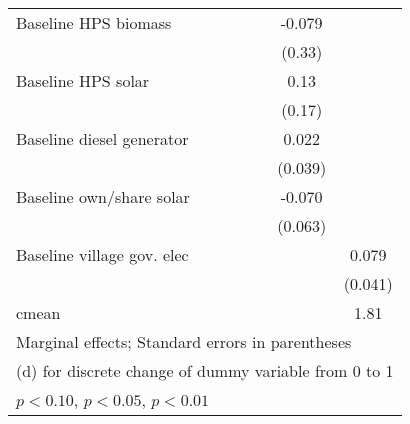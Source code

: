 \begin{table}[htbp]
\begin{tabular*}{1\hsize}{@{\hskip\tabcolsep\extracolsep\fill}l*{6}{c}}
Baseline HPS biomass&                  &                  &                  &                  &   -0.079         &                  \\
                &                  &                  &                  &                  &   (0.33)         &                  \\
Baseline HPS solar&                  &                  &                  &                  &     0.13         &                  \\
                &                  &                  &                  &                  &   (0.17)         &                  \\
Baseline diesel generator&                  &                  &                  &                  &    0.022         &                  \\
                &                  &                  &                  &                  &  (0.039)         &                  \\
Baseline own/share solar&                  &                  &                  &                  &   -0.070         &                  \\
                &                  &                  &                  &                  &  (0.063)         &                  \\
Baseline village gov. elec&                  &                  &                  &                  &                  &    0.079\sym{*}  \\
                &                  &                  &                  &                  &                  &  (0.041)         \\
\midrule
cmean           &                  &                  &                  &                  &                  &     1.81         \\
\bottomrule
\multicolumn{7}{l}{\footnotesize Marginal effects; Standard errors in parentheses}\\
\multicolumn{7}{l}{\footnotesize  (d) for discrete change of dummy variable from 0 to 1}\\
\multicolumn{7}{l}{\footnotesize \sym{*} \(p<0.10\), \sym{**} \(p<0.05\), \sym{***} \(p<0.01\)}\\
\end{tabular*}
\end{table}

